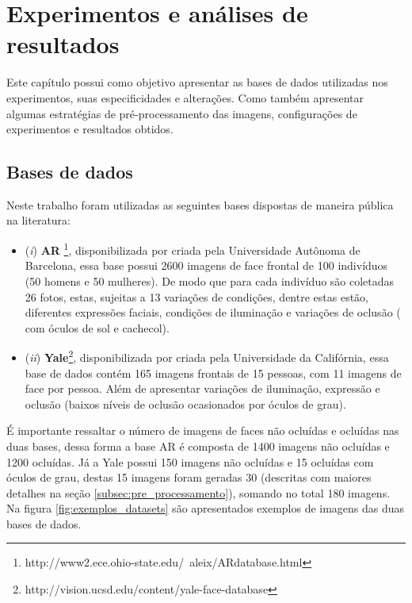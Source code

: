 \chapter{Experimentos e análises de resultados} 
\label{cp:8_Res_exp}

Este capítulo possui como objetivo apresentar as bases de dados utilizadas nos experimentos, suas especificidades e alterações. Como também apresentar algumas estratégias de pré-processamento das imagens, configurações de experimentos e resultados obtidos.

\section{Bases de dados}

 Neste trabalho foram utilizadas as seguintes bases dispostas de maneira pública na literatura: 
\begin{itemize}
\item (\textit{i}) \textbf{AR} \footnote{http://www2.ece.ohio-state.edu/~aleix/ARdatabase.html}, disponibilizada por  criada pela Universidade Autônoma de Barcelona, essa base possui 2600 imagens de face frontal de 100 indivíduos (50 homens e 50 mulheres). De modo que para cada indivíduo são coletadas 26 fotos, estas, sujeitas a 13 variações de condições, dentre estas estão, diferentes expressões faciais, condições de iluminação e variações de oclusão ( com óculos de sol e cachecol).

\item (\textit{ii}) \textbf{Yale}\footnote{http://vision.ucsd.edu/content/yale-face-database}, disponibilizada por  criada pela Universidade da Califórnia, essa base de dados contém 165 imagens frontais de 15 pessoas, com 11 imagens de face por pessoa. Além de apresentar variações de iluminação, expressão e oclusão (baixos níveis de oclusão ocasionados por óculos de grau).
	
\end{itemize}

É importante ressaltar o número de imagens de faces não ocluídas e ocluídas nas duas bases, dessa forma a base AR é composta de 1400 imagens não ocluídas e 1200 ocluídas. Já a Yale possui 150 imagens não ocluídas e 15 ocluídas com óculos de grau, destas 15 imagens foram geradas 30 (descritas com maiores detalhes na seção \ref{subsec:pre_processamento}), somando no total 180 imagens. Na figura \ref{fig:exemplos_datasets} são apresentados exemplos de imagens das duas bases de dados.


